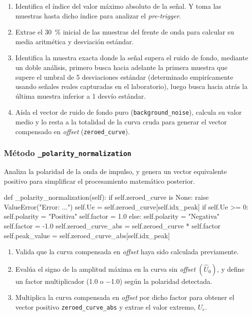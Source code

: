 \begin{enumerate}
    \item Identifica el índice del valor máximo absoluto de la señal. Y toma las muestras hasta dicho índice para analizar el \textit{pre-trigger}.
    \item Extrae el \SI{30}{\percent} inicial de las muestras del frente de onda para calcular su media aritmética y desviación estándar.
    \item Identifica la muestra exacta donde la señal supera el ruido de fondo, mediante un doble análisis, primero busca hacia adelante la primera muestra que supere el umbral de 5 desviaciones estándar (determinado empirícamente usando señales reales capturadas en el laboratorio), luego busca hacia atrás la última muestra inferior a 1 desvío estándar.
    \item Aísla el vector de ruido de fondo puro (\texttt{background\_noise}), calcula su valor medio y lo resta a la totalidad de la curva cruda para generar el vector compensado en \textit{offset} (\texttt{zeroed\_curve}).
\end{enumerate}

\subsubsection{Método \texttt{\_polarity\_normalization}}
Analiza la polaridad de la onda de impulso, y genera un vector equivalente positivo para simplificar el procesamiento matemático posterior.

\begin{python}
def _polarity_normalization(self):
    if self.zeroed_curve is None:
        raise ValueError("Error: ...")
    self.Ue = self.zeroed_curve[self.idx_peak]
    if self.Ue >= 0:
        self.polarity = "Positiva"
        self.factor = 1.0
    else:
        self.polarity = "Negativa"
        self.factor = -1.0
    self.zeroed_curve_abs = self.zeroed_curve * self.factor
    self.peak_value = self.zeroed_curve_abs[self.idx_peak]
\end{python}

\begin{enumerate}
    \item Valida que la curva compensada en \textit{offset} haya sido calculada previamente.
    \item Evalúa el signo de la amplitud máxima en la curva sin \textit{offset}  $(\hat{U} _0)$, y define un factor multiplicador (\num{1.0} o \num{-1.0}) según la polaridad detectada.
    \item Multiplica la curva compensada en \textit{offset} por dicho factor para obtener el vector positivo \texttt{zeroed\_curve\_abs} y extrae el valor extremo, $U_e$.
\end{enumerate}

